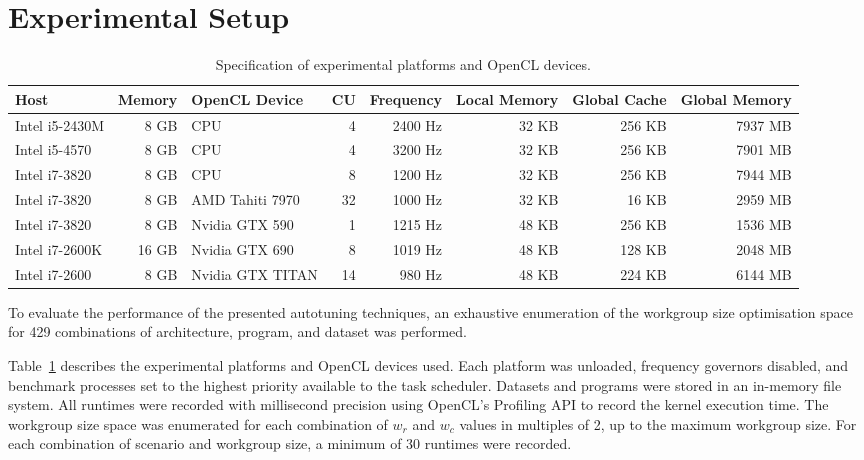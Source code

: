\documentclass{acaces}
\begin{document}
\section{Experimental Setup}

\begin{table}
\scriptsize
\centering
\begin{tabular}{l r | l r r r r r}
\toprule
Host & Memory &  OpenCL Device & CU & Frequency & Local Memory & Global Cache & Global Memory \\
\midrule
Intel i5-2430M & 8 GB  & CPU              &              4 &   2400 Hz &        32 KB &       256 KB &       7937 MB \\
Intel i5-4570  & 8 GB  & CPU              &              4 &   3200 Hz &        32 KB &       256 KB &       7901 MB \\
Intel i7-3820  & 8 GB  & CPU              &              8 &   1200 Hz &        32 KB &       256 KB &       7944 MB \\
Intel i7-3820  & 8 GB  & AMD Tahiti 7970  &             32 &   1000 Hz &        32 KB &        16 KB &       2959 MB \\
Intel i7-3820  & 8 GB  & Nvidia GTX 590   &              1 &   1215 Hz &        48 KB &       256 KB &       1536 MB \\
Intel i7-2600K & 16 GB & Nvidia GTX 690   &              8 &   1019 Hz &        48 KB &       128 KB &       2048 MB \\
Intel i7-2600  & 8 GB  & Nvidia GTX TITAN &             14 &    980 Hz &        48 KB &       224 KB &       6144 MB \\
\bottomrule
\end{tabular}
\caption{Specification of experimental platforms and OpenCL devices.}
\label{tab:hw}
\end{table}

To evaluate the performance of the presented autotuning techniques, an
exhaustive enumeration of the workgroup size optimisation space for
429 combinations of architecture, program, and dataset was performed.

Table~\ref{tab:hw} describes the experimental platforms and OpenCL
devices used. Each platform was unloaded, frequency governors
disabled, and benchmark processes set to the highest priority
available to the task scheduler. Datasets and programs were stored in
an in-memory file system. All runtimes were recorded with millisecond
precision using OpenCL's Profiling API to record the kernel execution
time. The workgroup size space was enumerated for each combination of
$w_r$ and $w_c$ values in multiples of 2, up to the maximum workgroup
size. For each combination of scenario and workgroup size, a minimum
of 30 runtimes were recorded.
\end{document}
